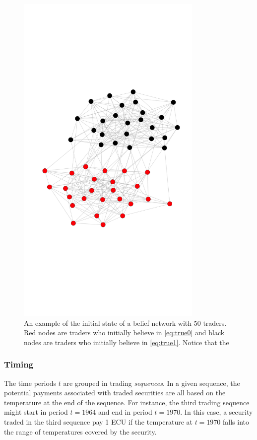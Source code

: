 \documentclass[10pt,a4paper]{article}
\begin{document}
 	\begin{figure}
 		\begin{center}
 		\includegraphics[width = 0.8\textwidth]{figures/segregated.png}
 		\end{center}
 		\caption{An example of the initial state of a belief network with 50 traders. Red nodes are traders who initially believe in \eqref{eq:true0} and black nodes are traders who initially believe in \eqref{eq:true1}. Notice that the  \label{socnet}}
 	\end{figure}
 	
 	\subsubsection{Timing}
 	
 	The time periods $t$ are grouped in trading \emph{sequences}. In a given sequence, the potential payments associated with traded securities are all based on the temperature at the end of the sequence. For instance, the third trading sequence might start in period $t=1964$ and end in period $t = 1970$. In this case, a security traded in the third sequence pay 1 ECU if the temperature at $t=1970$ falls into the range of temperatures covered by the security. 
 	
\end{document}
